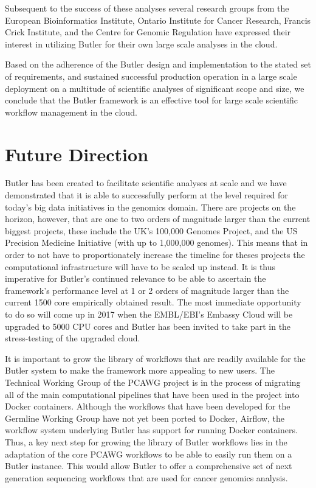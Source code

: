 Subsequent to the success of these analyses several research groups from the European Bioinformatics Institute, Ontario Institute for Cancer Research, Francis Crick Institute, and the Centre for Genomic Regulation have expressed their interest in utilizing Butler for their own large scale analyses in the cloud.

Based on the adherence of the Butler design and implementation to the stated set of requirements, and sustained successful production operation in a large scale deployment on a multitude of scientific analyses of significant scope and size, we conclude that the Butler framework is an effective tool for large scale scientific workflow management in the cloud.

\section{Future Direction}

Butler has been created to facilitate scientific analyses at scale and we have demonstrated that it is able to successfully perform at the level required for today's big data initiatives in the genomics domain. There are projects on the horizon, however, that are one to two orders of magnitude larger than the current biggest projects, these include the UK's 100,000 Genomes Project\autocite{marx2015dna}, and the US Precision Medicine Initiative\autocite{collins2015new} (with up to 1,000,000 genomes). This means that in order to not have to proportionately increase the timeline for theses projects the computational infrastructure will have to be scaled up instead. It is thus imperative for Butler's continued relevance to be able to ascertain the framework's performance level at 1 or 2 orders of magnitude larger than the current 1500 core empirically obtained result. The most immediate opportunity to do so will come up in 2017 when the EMBL/EBI's Embassy Cloud will be upgraded to 5000 CPU cores and Butler has been invited to take part in the stress-testing of the upgraded cloud. 

It is important to grow the library of workflows that are readily available for the Butler system to make the framework more appealing to new users. The Technical Working Group of the PCAWG project is in the process of migrating all of the main computational pipelines that have been used in the project into Docker\autocite{merkel2014docker} containers. Although the workflows that have been developed for the Germline Working Group have not yet been ported to Docker, Airflow, the workflow system underlying Butler has support for running Docker containers. Thus, a key next step for growing the library of Butler workflows lies in the adaptation of the core PCAWG workflows to be able to easily run them on a Butler instance. This would allow Butler to offer a comprehensive set of next generation sequencing workflows that are used for cancer genomics analysis.

